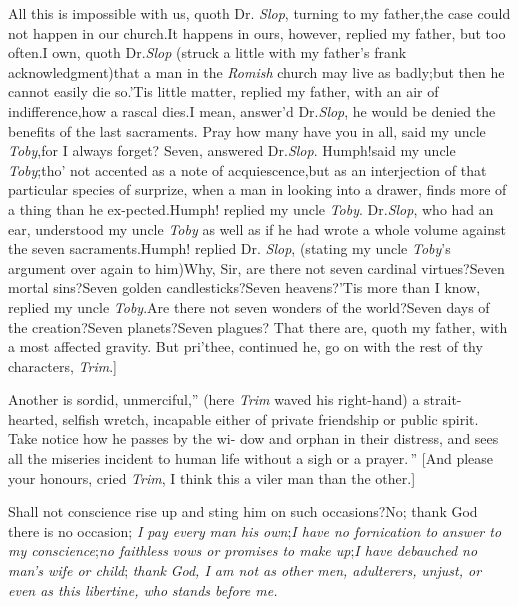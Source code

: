 \documentclass{article}
\begin{document}
All this is impossible with us, quoth Dr.\@
\textit{Slop}, turning to my father,\tsk the case could
not happen in our church.\tsh It\break
happens in ours,
however, replied my father, but too often.\tsh I own,
quoth Dr.\@ \textit{Slop} (struck a little with my
father’s frank acknowledgment)\tsk that a man in the
\textit{Romish} church may live as badly;\tsk\break but
then he cannot easily die so.\tsh ’Tis little matter,
replied my father, with an air of indifference,\tsk how
a rascal dies.\tsk\break I mean, answer’d Dr.\@ \textit{Slop},
he would be denied the benefits of the last
sacraments.\break
\tsk Pray how many have you in all, said my uncle
\textit{Toby},\tsk for I always forget?\tsk\break
Seven, answered Dr.\@ \textit{Slop}.\tsk
Humph!\tsk\break said my
uncle \textit{Toby};\tsk tho’ not accented as a note of
acquiescence,\tsk but as an interjection of that
particular species of surprize, when a man in looking
into a drawer, finds more of a thing than he
ex-\break pected.\tsk Humph! replied my uncle \textit{Toby}.
Dr.\@ \textit{Slop}, who had an ear, understood my uncle
\textit{Toby} as well as if he had wrote a whole volume
against the seven sacraments.\tsh Humph! replied Dr.\@
\textit{Slop}, (stating my uncle \textit{Toby}’s
argument over again to him)\tsh Why, Sir, are there not
seven cardinal virtues?\tsh Seven mortal sins?\tsh Seven
golden candlesticks?\tsh Seven heavens?\tsh ’Tis\break
more than I know, replied my uncle\break
\textit{Toby}.\tsh Are
there not seven wonders of the world?\tsh Seven days of
the creation?\tsh Seven planets?\tsh Seven plagues?\tsh
That there are, quoth my father, with a most affected
gravity. But pri’thee, continued he, go on with the rest
of thy characters, \textit{Trim}.]

\lqq Another is sordid, unmerciful,” (here\break
\textit{Trim} waved his right-hand) \lqq a strait-\break
\lqq hearted, selfish wretch, incapable either\break
\lqq of private friendship or public spirit.\break
\lqq Take notice how he passes by the wi-\break
\lqq dow and orphan in their distress, and\break
\lqq sees all the miseries incident to human\break
\lqq life without a sigh or a prayer.\,” [And
please your honours, cried
\textit{Trim}, I think this a viler man than the other.]

\lqq Shall not conscience rise up and sting\break
\lqq him on such occasions?\tsh No; thank\break
\lqq God there is no occasion; \textit{I pay every}\break
\lqq \textit{man his own};\textit{\tsk I have no fornication to}\break
\lqq \textit{answer to my conscience};\textit{\tsk no faithless}\break
\lqq \textit{vows or promises to make up};\textit{\tsk I have}\break
\lqq \textit{debauched no man’s wife or child}; \textit{thank}\break
\lqq \textit{God, I am not as other men, adulterers,}\break
\lqq \textit{unjust, or even as this libertine, who}\break
\lqq \textit{stands before me.}
\end{document}
